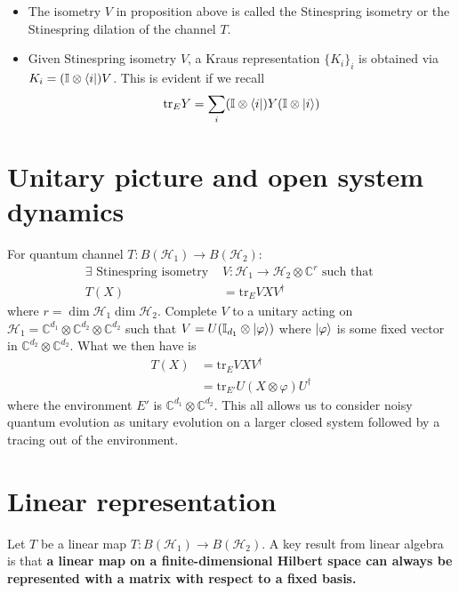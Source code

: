 \documentclass[10pt,oneside,longbibliography]{report}
\begin{document}
\begin{itemize}
    \item The isometry $V$ in proposition above is called the Stinespring isometry or the Stinespring dilation of the channel $T$. 
    \item Given Stinespring isometry $V$, a Kraus representation $\{K_i\}_i$ is obtained via $K_i=(\mathbb{I} \otimes \bra{i})V$. This is evident if we recall
    \begin{align}
        \text{tr}_E Y = \sum_i (\mathbb{I} \otimes \bra{i}) Y (\mathbb{I} \otimes \ket{i})
    \end{align}
\end{itemize}

\section{Unitary picture and open system dynamics}
For quantum channel $T: B(\mathcal{H}_1) \rightarrow B(\mathcal{H}_2)$: 
\begin{align}
    \exists \text{ Stinespring isometry } &V: \mathcal{H}_1 \rightarrow \mathcal{H}_2 \otimes \mathbb{C}^r \text{ such that } \\
    T(X)&= \text{tr}_E VXV^{\dagger}
\end{align}
where $r=\dim\mathcal{H}_1\dim\mathcal{H}_2$. Complete $V$ to a unitary acting on $ \mathcal{H}_1 = \mathbb{C}^{d_1} \otimes \mathbb{C}^{d_2} \otimes \mathbb{C}^{d_2}$ such that $V=U(\mathbb{I}_{d_1} \otimes \ket{\varphi})$ where $\ket{\varphi}$ is some fixed vector in $\mathbb{C}^{d_2}\otimes \mathbb{C}^{d_2}$. What we then have is 
\begin{align}
    T(X) &= \text{tr}_E VXV^{\dagger} \\
    &= \text{tr}_{E'} U(X \otimes \varphi) U^{\dagger} 
\end{align}
where the environment $E'$ is $\mathbb{C}^{d_1}\otimes \mathbb{C}^{d_2}$. This all allows us to consider noisy quantum evolution as unitary evolution on a larger closed system followed by a tracing out of the environment.

\section{Linear representation}
Let $T$ be a linear map $T: B(\mathcal{H}_1) \rightarrow B(\mathcal{H}_2)$. A key result from linear algebra is that \textbf{a linear map on a finite-dimensional Hilbert space can always be represented with a matrix with respect to a fixed basis.} 
\end{document}
